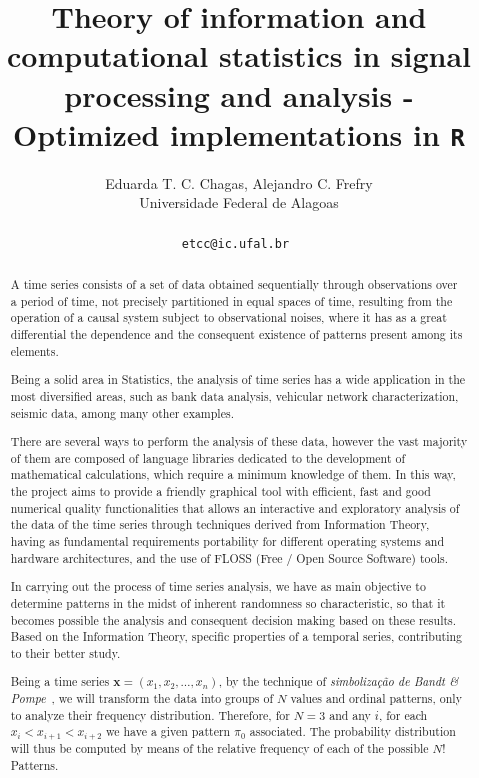 \documentclass[a4paper]{article}
\date{}
\begin{document}
\thispagestyle{empty}

\title{\textbf{Theory of information and computational statistics in signal processing and analysis - Optimized implementations in \texttt{R}}}

\author{Eduarda T. C. Chagas, Alejandro C. Frefry \\ 
	Universidade Federal de Alagoas \\ \\ 
	\tt{etcc@ic.ufal.br}
}

\date{}
\maketitle\thispagestyle{empty} 


\begin{abstract}
A time series consists of a set of data obtained sequentially through observations over a period of time, not precisely partitioned in equal spaces of time, resulting from the operation of a causal system subject to observational noises, where it has as a great differential the dependence and the consequent existence of patterns present among its elements.

Being a solid area in Statistics, the analysis of time series has a wide application in the most diversified areas, such as bank data analysis, vehicular network characterization, seismic data, among many other examples.

There are several ways to perform the analysis of these data, however the vast majority of them are composed of language libraries dedicated to the development of mathematical calculations, which require a minimum knowledge of them. In this way, the project aims to provide a friendly graphical tool with efficient, fast and good numerical quality functionalities that allows an interactive and exploratory analysis of the data of the time series through techniques derived from Information Theory, having as fundamental requirements portability for different operating systems and hardware architectures, and the use of FLOSS (Free / Open Source Software) tools.

In carrying out the process of time series analysis, we have as main objective to determine patterns in the midst of inherent randomness so characteristic, so that it becomes possible the analysis and consequent decision making based on these results.
Based on the Information Theory, specific properties of a
temporal series, contributing to their better study.

Being a time series $\bm x = (x_1, x_2, \dots, x_n)$, by the technique of \textit{simbolização de Bandt \& Pompe}~\cite{PermutationEntropyBandtPompe},
we will transform the data into groups of $N$ values and ordinal patterns, only to analyze their frequency distribution. Therefore, for $N = 3$ and any $i$,
for each $x_i<x_{i+1}<x_{i+2}$ we have a given pattern $\pi_0$ associated. The probability distribution will thus be computed by means of the relative frequency of each of the possible $N!$ Patterns.


\end{abstract}
\end{document}
